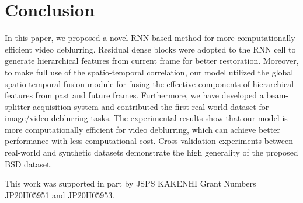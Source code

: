 \documentclass[twocolumn]{svjour3}          \smartqed  \usepackage{graphicx}
\begin{document}
\section{Conclusion}
In this paper, we proposed a novel RNN-based method for more computationally efficient video deblurring. Residual dense blocks were adopted to the RNN cell to generate hierarchical features from current frame for better restoration. Moreover, to make full use of the spatio-temporal correlation, our model utilized the global spatio-temporal fusion module for fusing the effective components of hierarchical features from past and future frames. Furthermore, we have developed a beam-splitter acquisition system and contributed the first real-world dataset for image/video deblurring tasks. The experimental results show that our model is more computationally efficient for video deblurring, which can achieve better performance with less computational cost. Cross-validation experiments between real-world and synthetic datasets demonstrate the high generality of the proposed BSD dataset.

\begin{acknowledgements}
This work was supported in part by JSPS KAKENHI Grant Numbers JP20H05951 and JP20H05953.
\end{acknowledgements}





         
\end{document}
